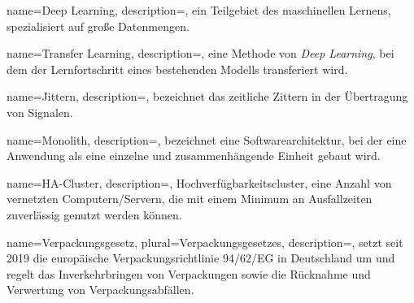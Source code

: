 {
  name={Deep Learning},
  description={, ein Teilgebiet des maschinellen Lernens, spezialisiert auf große Datenmengen.  \autocite{wuttke_deep}}
}

{
  name={Transfer Learning},
  description={, eine Methode von \textit{\gls{Deep Learning}}, bei dem der Lernfortschritt eines bestehenden Modells transferiert wird.  \autocite{wuttke_transfer}}
}

{
  name={Jittern},
  description={, bezeichnet das zeitliche Zittern in der Übertragung von Signalen. \autocite{jittern}}
}

{
  name={Monolith},
  description={, bezeichnet eine Softwarearchitektur, bei der eine Anwendung als eine einzelne und zusammenhängende Einheit gebaut wird. \autocite{monolith}}
}

{
  name={HA-Cluster},
  description={, Hochverfügbarkeitscluster, eine Anzahl von vernetzten Computern/Servern, die mit einem Minimum an Ausfallzeiten zuverlässig genutzt werden können. \autocite{cluster}}
}

{
  name={Verpackungsgesetz},
  plural={Verpackungsgesetzes},
  description={, setzt seit 2019 die europäische Verpackungsrichtlinie 94/62/EG in Deutschland um und regelt das Inverkehrbringen von Verpackungen sowie die Rücknahme und Verwertung von Verpackungsabfällen. \autocite{verpackungsgesetz}}
}